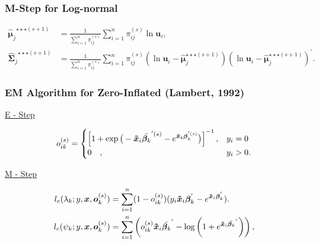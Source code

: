 \documentclass{beamer}
\begin{document}
\begin{frame}
\frametitle{M-Step for Log-normal}
\begin{small}
\begin{align*}
{\hat{\bm \mu}_j}^{\star\star\star (s+1)} &=\frac{1}{\sum_{i=1}^n \pi_{ij}^{(s)}} \sum_{i=1}^n \pi_{ij}^{(s)}\ln \bm u_i, \\
{\widehat{\bm \Sigma}_j}^{\star\star\star(s+1)} & =\frac{1}{\sum_{i=1}^n \pi_{ij}^{(s)}} \sum_{i=1}^n \pi_{ij}^{(s)}(\ln \bm u_i-\hat{\bm \mu}^{\star\star\star(s+1)}_j) (\ln \bm u_i-\hat{\bm \mu}^{\star\star\star(s+1)}_j)^{'}. 
\end{align*}
\end{small}
\end{frame}
\begin{frame}
\frametitle{EM  Algorithm for Zero-Inflated (Lambert, 1992)}
\begin{center}
\underline{E - Step}
\end{center}
\begin{small}
\begin{align*}
o_{ik}^{(s)} = \begin{cases}  \left[ 1 + \exp{\big(-\bm{\tilde{x}}_i \bar{\bm{\beta}_k}^{'(s)} - e^ {\bm{\bm{\tilde{x}}_i} \bm{\beta}_k^{'(s)}} \big) } \right]^{-1}, &  y_{i} = 0 \\
  0 \quad , & y_{i}> 0 .
\end{cases}
\end{align*}
\end{small}

\begin{center}
\underline{M - Step}
\end{center}
\begin{small}
\begin{align}
 l_c(\lambda_k; y,\bm{x},\bm{o}_k^{(s)}) &= \sum_{i=1}^n (1- o_{ik}^{(s)}) (y_i \bm{\tilde{x}}_i \bm{\beta}_k^{'}  - e^{\bm{\tilde{x}}_i \bm{\beta}_k^{'}})\label{eq7}.\\
l_c(\psi_k;y,\bm{x},\bm{o}_k^{(s)}) &=\sum_{i=1}^n \left( o_{ik}^{(s)} \bm{\tilde{x}}_i \bar{\bm{\beta}_k }^{'} - \log \left(1+ e^{ \bm{\tilde{x}}_i \bar{\bm{\beta}_k }^{'}} \right) \right), \label{eq6}   
 \end{align}
\end{small}
\end{frame}
\end{document}
